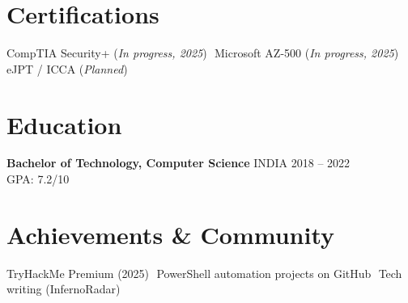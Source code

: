 \documentclass[11pt]{article}
\newcommand{\sep}{\,\textbar\,}
\newcommand{\location}[1]{\hfill {\small #1}}
\newcommand{\daterange}[1]{\hfill {\small #1}}
\begin{document}
\section*{Certifications}
CompTIA Security+ (\emph{In progress, 2025}) \sep Microsoft AZ-500 (\emph{In progress, 2025}) \sep eJPT / ICCA (\emph{Planned})

\section*{Education}
\textbf{Bachelor of Technology, Computer Science} \location{INDIA} \daterange{2018 -- 2022}\\
GPA: 7.2/10

\section*{Achievements \& Community}
TryHackMe Premium (2025) \sep PowerShell automation projects on GitHub \sep Tech writing (InfernoRadar)

\end{document}
